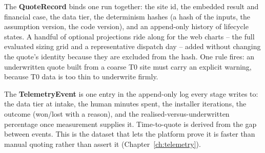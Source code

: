 The \textbf{QuoteRecord} binds one run together: the site id, the embedded result and financial case, the data tier, the determinism hashes (a hash of the inputs, the assumption version, the code version), and an append-only history of lifecycle states. A handful of optional projections ride along for the web charts -- the full evaluated sizing grid and a representative dispatch day -- added without changing the quote's identity because they are excluded from the hash. One rule fires: an underwritten quote built from a coarse T0 site must carry an explicit warning, because T0 data is too thin to underwrite firmly.

The \textbf{TelemetryEvent} is one entry in the append-only log every stage writes to: the data tier at intake, the human minutes spent, the installer iterations, the outcome (won/lost with a reason), and the realised-versus-underwritten percentage once measurement supplies it. Time-to-quote is derived from the gap between events. This is the dataset that lets the platform prove it is faster than manual quoting rather than assert it (Chapter~\ref{ch:telemetry}).

